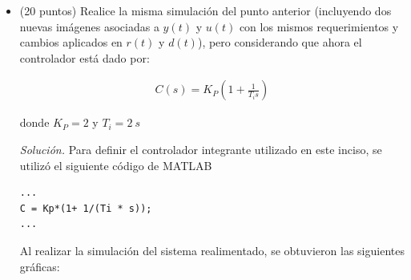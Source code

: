 \begin{itemize}
\item (20 puntos) Realice la misma simulación del punto anterior (incluyendo dos nuevas
imágenes asociadas a $y(t)$ y $u(t)$ con los mismos requerimientos y cambios aplicados en
$r(t)$ y $d(t)$), pero considerando que ahora el controlador está dado por:

\begin{align*}
    C(s) = K_P \left( 1 + \frac{1}{T_i s} \right) 
\end{align*}

donde $K_P = 2$ y $T_i = \SI{2}{s}$

\textit{Solución.} Para definir el controlador integrante utilizado en este inciso, se utilizó el siguiente código de MATLAB
\vspace{1em}
\begin{mdframed}
\begin{verbatim}
...
C = Kp*(1+ 1/(Ti * s));
...
\end{verbatim}
\end{mdframed}
Al realizar la simulación del sistema realimentado, se obtuvieron las siguientes gráficas:


\end{itemize}
